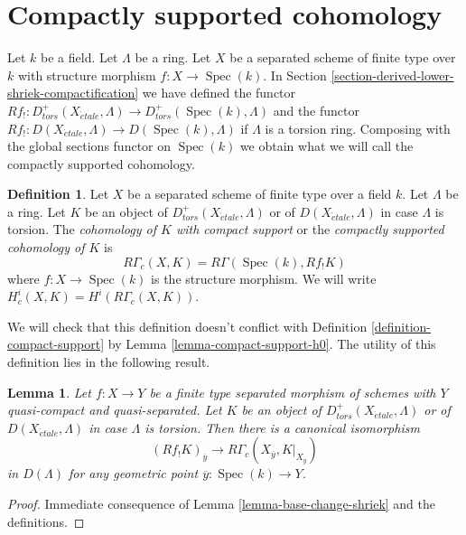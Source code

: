 \documentclass{stacks-project}
\theoremstyle{plain}
\newtheorem{lemma}[subsection]{Lemma}
\theoremstyle{definition}
\newtheorem{definition}[subsection]{Definition}
\theoremstyle{remark}
\numberwithin{equation}{subsection}
\def\Spec{\mathop{\mathrm{Spec}}}
\def\etale{{\acute{e}tale}}
\begin{document}
\section{Compactly supported cohomology}
\label{section-compactly-supported-cohomology}

\noindent
Let $k$ be a field. Let $\Lambda$ be a ring. Let $X$ be a separated scheme
of finite type over $k$ with structure morphism $f : X \to \Spec(k)$.
In Section \ref{section-derived-lower-shriek-compactification}
we have defined the functor
$Rf_! : D^+_{tors}(X_\etale, \Lambda) \to D^+_{tors}(\Spec(k), \Lambda)$
and the functor $Rf_! : D(X_\etale, \Lambda) \to D(\Spec(k), \Lambda)$
if $\Lambda$ is a torsion ring. Composing with the global sections functor
on $\Spec(k)$ we obtain what we will call the compactly supported cohomology.

\begin{definition}
\label{definition-cohomology-compact-support}
Let $X$ be a separated scheme of finite type over a field $k$.
Let $\Lambda$ be a ring. Let $K$ be an object of
$D^+_{tors}(X_\etale, \Lambda)$
or of $D(X_\etale, \Lambda)$ in case $\Lambda$ is torsion.
The {\it cohomology of $K$ with compact support} or the
{\it compactly supported cohomology of $K$} is
$$
R\Gamma_c(X, K) = R\Gamma(\Spec(k), Rf_!K)
$$
where $f : X \to \Spec(k)$ is the structure morphism. We will
write  $H^i_c(X, K) = H^i(R\Gamma_c(X, K))$.
\end{definition}

\noindent
We will check that this definition doesn't conflict with
Definition \ref{definition-compact-support} by
Lemma \ref{lemma-compact-support-h0}.
The utility of this definition lies in the following result.

\begin{lemma}
\label{lemma-stalk-R-f-shriek}
Let $f : X \to Y$ be a finite type separated morphism of schemes
with $Y$ quasi-compact and quasi-separated. Let $K$ be an object of
$D^+_{tors}(X_\etale, \Lambda)$ or of $D(X_\etale, \Lambda)$ in case
$\Lambda$ is torsion. Then there is a canonical isomorphism
$$
(Rf_!K)_{\overline{y}}
\longrightarrow
R\Gamma_c(X_{\overline{y}}, K|_{X_{\overline{y}}})
$$
in $D(\Lambda)$ for any geometric point $\overline{y} : \Spec(k) \to Y$.
\end{lemma}

\begin{proof}
Immediate consequence of Lemma \ref{lemma-base-change-shriek} and the
definitions.
\end{proof}
\end{document}
